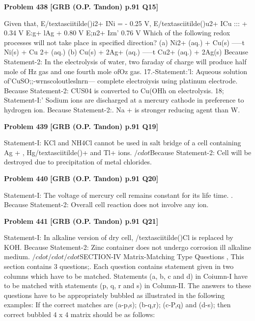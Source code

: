 \begin{problembox}
\textbf{Problem 438} \hfill \textbf{[GRB (O.P. Tandon) p.91 Q15]}
\label{q:ext-grb_all_questions-438}

Given that, 
E/textasciitilde()i2+ INi = - 0.25 V, E/textasciitilde()u2+ ICu ::: + 0.34 V 
E:g+ lAg 
+ 0.80 V E;n2+ Izn' 
0.76 V 
Which of the following redox processes will not take place in 
specified direction? 
(a) Ni2+ (aq.) + Cu(s) -----t Ni(s) + Cu 2+ (aq.) 
(b) Cu(s) + 2Ag+ (aq.) -----t Cu2+ (aq.) + 2Ag(s) 
Because 
Statement-2: In the electrolysis of water, two faraday of 
charge will produce half mole of Hz gas and one fourth mole 
ofOz gas. 
17.-Statement:'l: Aqueous solution of'CuSO;;-wrnscoloutleslnrn---
complete electroiysis using platinum electrode. 
Because 
Statement-2: CUS04 is converted to Cu(OHh on electrolysis. 
18; Statement-I:' Sodium ions are discharged at a mercury 
cathode in preference to hydrogen ion. 
Because 
Statement-2:. Na + is stronger reducing agent than W.
\end{problembox}

\begin{problembox}
\textbf{Problem 439} \hfill \textbf{[GRB (O.P. Tandon) p.91 Q19]}
\label{q:ext-grb_all_questions-439}

Statement-I: KCl and NH4Cl cannot be used in salt bridge of 
a cell containing Ag + , Hg/textasciitilde()+ and Tl+ ions. 
$/cdot$Because 
Statement-2: Cell will be destroyed due to precipitation of 
metal chlorides.
\end{problembox}

\begin{problembox}
\textbf{Problem 440} \hfill \textbf{[GRB (O.P. Tandon) p.91 Q20]}
\label{q:ext-grb_all_questions-440}

Statement-I: The voltage of mercury cell remains constant 
for its life time. 
. 
Because 
Statement-2: Overall cell reaction does not involve any ion.
\end{problembox}

\begin{problembox}
\textbf{Problem 441} \hfill \textbf{[GRB (O.P. Tandon) p.91 Q21]}
\label{q:ext-grb_all_questions-441}

Statement-I: In alkaline version of dry cell, /textasciitilde()Cl is 
replaced by KOH. 
Because 
Statement-2: Zinc container does not undergo corrosion ill 
alkaline medium. 
$/cdot$$/cdot$$/cdot$SECTION-IV 
Matrix-Matching Type Questions 
, 
This section contains 3 questions;. Each question contains 
statement given in two columns which have to be matched. 
Statements (a, b, c and d) in Coiumn-I have to be matched with 
statements (p, q, r and s) in Column-II. The answers to these 
questions have to be appropriately bubbled as illustrated in the 
following examples: 
If the correct matches are (a-p,s); (b-q,r); (c-P,q) and (d-s); 
then correct bubbled 4 x 4 matrix should be as follows:
\end{problembox}

